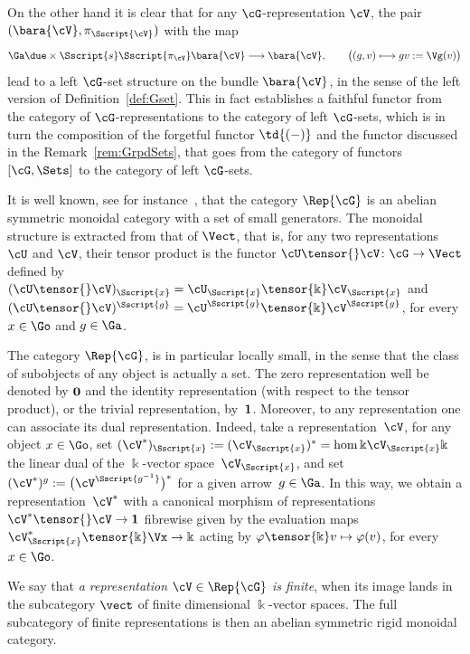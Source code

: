 \begin{Remark}
On the other hand it is clear that for any $\cG$-representation $\cV$, the pair $(\bara{\cV}, \pi_{\Sscript{\cV}})$ with the map
\begin{gather}\label{Eq:actionV}
\Ga \due \times {\Sscript{s}} { \Sscript{\pi_{\cV}}} \bara{\cV} \longrightarrow \bara{\cV},\qquad \big((g,v) \longmapsto gv:=\Vg(v) \big)
\end{gather}
lead to a left $\cG$-set structure on the bundle $\bara{\cV}$, in the sense of the left version of Definition~\ref{def:Gset}. This in fact establishes a faithful functor from the category of $\cG$-representations to the category of left $\cG$-sets, which is in turn the composition of the forgetful functor $\td{(-)}$ and the functor discussed in the Remark~\ref{rem:GrpdSets}, that goes from the category of functors $[\cG, \Sets]$ to the category of left $\cG$-sets.
\end{Remark}

It is well known, see for instance~\cite{Mitchell:1965}, that the category $\Rep{\cG}$ is an abelian symmetric monoidal category with a set of small generators. The monoidal structure is extracted from that of $\Vect$, that is, for any two representations $\cU$ and $\cV$, their tensor product is the functor $\cU \tensor{}\cV\colon \cG \to \Vect$ defined by $(\cU\tensor{}\cV)_{\Sscript{x}}= \cU_{\Sscript{x}} \tensor{\Bbbk}\cV_{\Sscript{x}}$ and
$(\cU\tensor{}\cV)^{\Sscript{g}}= \cU^{\Sscript{g}}\tensor{\Bbbk} \cV^{\Sscript{g}}$, for every $x \in \Go$ and $g \in \Ga$.

The category $\Rep{\cG}$, is in particular locally small, in the sense that the class of subobjects of any object is actually a set. The zero representation well be denoted by $\bf 0$ and the identity representation (with respect to the tensor product), or the trivial representation, by~$\bf 1$. Moreover, to any representation one can associate its dual representation. Indeed, take a representation~$\cV$, for any object $x \in \Go$, set $(\cV^*)_{\Sscript{x}}:= (\cV_{\Sscript{x}})^*=\hom{\Bbbk}{\cV_{\Sscript{x}}}{\Bbbk}$ the linear dual of the $\Bbbk$-vector space~$\cV_{\Sscript{x}}$, and set $(\cV^*){}^g:= \big(\cV^{\Sscript{g^{-1}}}\big)^*$ for a given arrow~$g \in \Ga$. In this way, we obtain a representation~$\cV^*$ with a canonical morphism of representations $\cV^* \tensor{} \cV \to {\bf 1}$ fibrewise given by the evaluation maps $\cV^*_{\Sscript{x}} \tensor{\Bbbk} \Vx \to \Bbbk$ acting by $\varphi \tensor{\Bbbk}v \mapsto \varphi(v)$, for every $x \in \Go$.

We say that \emph{a representation $\cV \in \Rep{\cG}$ is finite}, when its image lands in the subcategory $\vect$ of finite dimensional $\Bbbk$-vector spaces. The full subcategory of finite representations is then an abelian symmetric rigid monoidal category.


